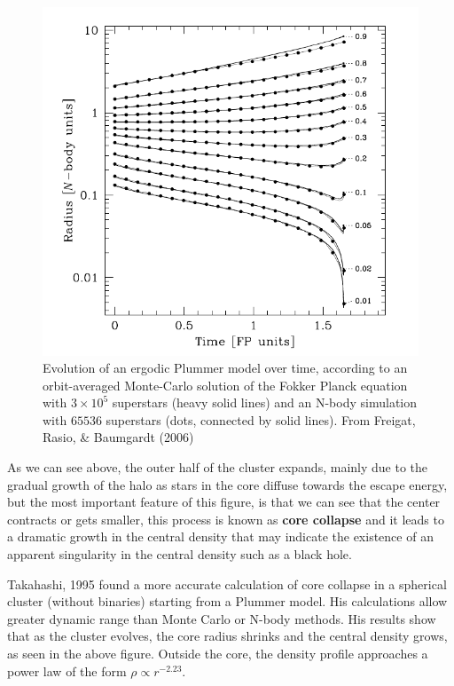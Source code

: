 \begin{figure}[H]
\centering
\includegraphics[width=12cm]{images/core_collapse.png}
\caption[Evolution of an ergodic Plummer model over time]{Evolution of an ergodic Plummer model over time, according to an orbit-averaged Monte-Carlo solution of the Fokker Planck equation with $3\times10^{5}$ superstars (heavy solid lines) and an N-body simulation with $65536$ superstars (dots, connected by solid lines). From Freigat, Rasio, \& Baumgardt (2006)}
\end{figure}

As we can see above, the outer half of the cluster expands, mainly due to the gradual growth of the halo as stars in the core diffuse towards the escape energy, but the most important feature of this figure, is that we can see that the center contracts or gets smaller, this process is known as \textbf{core collapse} and it leads to a dramatic growth in the central density that may indicate the existence of an apparent singularity in the central density such as a black hole.

Takahashi, 1995 found a more accurate calculation of core collapse in a spherical cluster (without binaries) starting from a Plummer model. His calculations allow greater dynamic range than Monte Carlo or N-body methods. His results show that as the cluster evolves, the core radius shrinks  and the central density grows, as seen in the above figure. Outside the core, the density profile approaches a power law of the form $\rho\varpropto r^{-2.23}$.

